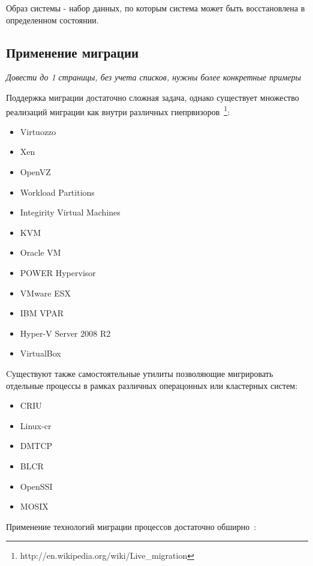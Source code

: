 \begin{Def}\label{process_image}
Образ системы - набор данных, по которым система может быть восстановлена в определенном состоянии.
\end{Def}

\subsection{Применение миграции}

\textit{Довести до 1 страницы, без учета списков, нужны более конкретные примеры}

Поддержка миграции достаточно сложная задача, однако существует множество реализаций миграции как внутри различных гиепрвизоров~\footnote{http://en.wikipedia.org/wiki/Live\_migration}:

\begin{itemize}

    \item Virtuozzo
    \item Xen
    \item OpenVZ
    \item Workload Partitions
    \item Integirity Virtual Machines
    \item KVM
    \item Oracle VM
    \item POWER Hypervisor
    \item VMware ESX
    \item IBM VPAR
    \item Hyper-V Server 2008 R2
    \item VirtualBox

\end{itemize}

Cуществуют также самостоятельные утилиты позволяющие мигрировать отдельные процессы в рамках различных операцонных или кластерных систем:

\begin{itemize}

    \item CRIU
    \item Linux-cr
    \item DMTCP
    \item BLCR
    \item OpenSSI
    \item MOSIX

\end{itemize}

Применение технологий миграции процессов достаточно обширно~\cite{criu_yandex_presentation}:

